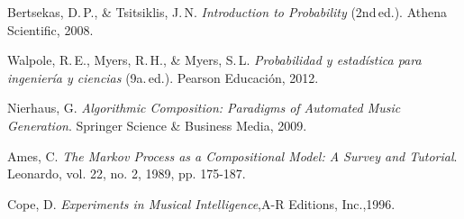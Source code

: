 \documentclass{article}
\theoremstyle{plain}
\theoremstyle{definition}
\begin{document}
\begin{thebibliography}{}
    Bertsekas, D.\,P., \& Tsitsiklis, J.\,N. \textit{Introduction to Probability} (2nd\,ed.). Athena Scientific, 2008.

    Walpole, R.\,E., Myers, R.\,H., \& Myers, S.\,L. \textit{Probabilidad y estadística para ingeniería y ciencias} (9a.\,ed.). Pearson Educación, 2012.

    Nierhaus, G. \textit{Algorithmic Composition: Paradigms of Automated Music Generation}. Springer Science \& Business Media, 2009.

    Ames, C. \textit{The Markov Process as a Compositional Model: A Survey and Tutorial}. Leonardo, vol. 22, no. 2, 1989, pp. 175-187.

    Cope, D. \textit{Experiments in Musical Intelligence},A-R Editions, Inc.,1996. 

\end{thebibliography}
\end{document}
